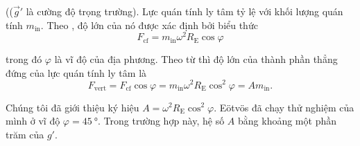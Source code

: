 \noindent
(($\vec{g}'$ là cường độ trọng trường). Lực quán tính ly tâm tỷ lệ với khối lượng quán tính $m_{\text{in}}$. Theo , độ lớn của nó được xác định bởi biểu thức
\begin{equation*}
	F_{\text{cf}} = m_{\text{in}}\omega^2R_{\text{E}}\cos\varphi
\end{equation*}

\noindent
trong đó $\varphi$ là vĩ độ của địa phương. Theo từ  thì độ lớn của thành phần thẳng đứng của lực quán tính ly tâm là
\begin{equation*}
	F_{\text{vert}} = F_{\text{cf}}\cos\varphi =  m_{\text{in}}\omega^2R_{\text{E}}\cos^2\varphi = Am_{\text{in}}.
\end{equation*}

\noindent
Chúng tôi đã giới thiệu ký hiệu $A=\omega^2R_{\text{E}}\cos^2\varphi$. E\"{o}tv\"{o}s đã chạy thử nghiệm của mình ở vĩ độ $\varphi=\SI{45}{\degree}$. Trong trường hợp này, hệ số $A$ bằng khoảng một phần trăm của $g'$.

